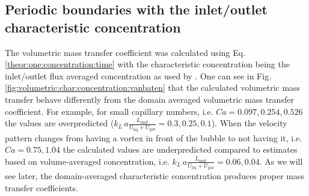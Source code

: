 \documentclass[review,12pt]{elsarticle}
\newcommand{\vol}{k_L\,a}
\newcommand{\lunit}{L_{\mathrm{unit}}}
\newcommand{\uliq}{U_{\mathrm{liq}}}
\newcommand{\ugas}{U_{\mathrm{gas}}}
\newcommand{\volnondim}{\vol \frac{\lunit}{\uliq+\ugas}}
\begin{document}
\subsection{Periodic boundaries with the inlet/outlet characteristic concentration}
\label{results:periodic:inlet:outlet} 
The volumetric mass transfer coefficient
was calculated using Eq. \ref{theor:one:concentration:time} with the
characteristic concentration being the inlet/outlet flux averaged concentration
as used by \citet{vanbaten-circular}. One can see in Fig.
\ref{fig:volumetric:char:concentration:vanbaten} that the calculated volumetric mass
transfer behave differently from the domain averaged  volumetric mass
transfer coefficient. For example, for small capillary numbers, i.e.
$Ca=0.097,0.254,0.526$ the values are overpredicted
($\volnondim=0.3,0.25,0.1$). When the velocity pattern changes from having
a vortex in front of
the bubble to not having it,  i.e. $Ca=0.75,1.04$ the calculated values
are underpredicted compared to estimates based on volume-averaged concentration, i.e. $\volnondim=0.06,0.04$. As we will see later, the domain-averaged characteristic concentration produces proper mass transfer coefficients. 
\end{document}
